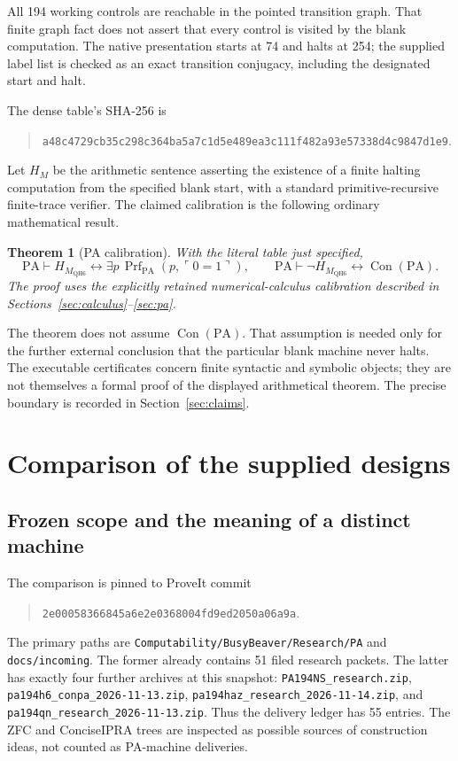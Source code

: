 \documentclass[11pt,letterpaper]{article}
\newcommand{\PA}{\mathrm{PA}}
\newcommand{\Con}{\operatorname{Con}}
\newcommand{\Prf}{\operatorname{Prf}}
\newcommand{\file}[1]{\texttt{\nolinkurl{#1}}}
\newcommand{\MX}{M_{\mathrm{QH6}}}
\newtheorem{theorem}{Theorem}[section]
\begin{document}
All 194 working controls are reachable in the pointed transition graph.
That finite graph fact does not assert that every control is visited by
the blank computation. The native presentation starts at 74 and halts at
254; the supplied label list is checked as an exact transition conjugacy,
including the designated start and halt.

The dense table's SHA-256 is
\begin{quote}\small
\nolinkurl{a48c4729cb35c298c364ba5a7c1d5e489ea3c111f482a93e57338d4c9847d1e9}.
\end{quote}

Let \(H_M\) be the arithmetic sentence asserting the existence of a finite
halting computation from the specified blank start, with a standard
primitive-recursive finite-trace verifier. The claimed calibration is
the following ordinary mathematical result.

\begin{theorem}[PA calibration]\label{thm:main}
With the literal table just specified,
\[
 \PA\vdash H_{\MX}\leftrightarrow
  \exists p\,\Prf_{\PA}(p,\ulcorner0=1\urcorner),
 \qquad
 \PA\vdash\neg H_{\MX}\leftrightarrow\Con(\PA).
\]
The proof uses the explicitly retained numerical-calculus calibration
described in Sections~\ref{sec:calculus}--\ref{sec:pa}.
\end{theorem}

The theorem does not assume \(\Con(\PA)\). That assumption is needed only
for the further external conclusion that the particular blank machine
never halts. The executable certificates concern finite syntactic and
symbolic objects; they are not themselves a formal proof of the displayed
arithmetical theorem. The precise boundary is recorded in
Section~\ref{sec:claims}.

\section{Comparison of the supplied designs}\label{sec:comparison}

\subsection{Frozen scope and the meaning of a distinct machine}

The comparison is pinned to ProveIt commit
\begin{quote}\small
\nolinkurl{2e00058366845a6e2e0368004fd9ed2050a06a9a}.
\end{quote}
The primary paths are \file{Computability/BusyBeaver/Research/PA} and
\file{docs/incoming}. The former already contains 51 filed research
packets. The latter has exactly four further archives at this snapshot:
\file{PA194NS_research.zip}, \file{pa194h6_conpa_2026-11-13.zip},
\file{pa194haz_research_2026-11-14.zip}, and
\file{pa194qn_research_2026-11-13.zip}. Thus the delivery ledger has
55 entries. The ZFC and ConciseIPRA trees are inspected as possible sources
of construction ideas, not counted as PA-machine deliveries.
\end{document}
